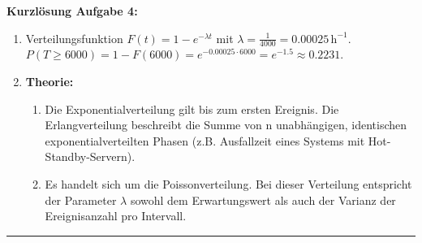 \documentclass[11pt,a4paper]{article}
\begin{document}
\newpage

\textbf{Kurzlösung Aufgabe 4:}
\begin{enumerate}
    \item[a)] Verteilungsfunktion $F(t) = 1 - e^{-\lambda t}$ mit $\lambda = \frac{1}{4000} = 0.00025 \, \text{h}^{-1}$. \\
    $P(T \ge 6000) = 1 - F(6000) = e^{-0.00025 \cdot 6000} = e^{-1.5} \approx 0.2231.$
    \item[b)] \textbf{Theorie:}
    \begin{enumerate}
        \item[1.] Die Exponentialverteilung gilt bis zum ersten Ereignis. Die Erlangverteilung beschreibt die Summe von n unabhängigen, identischen exponentialverteilten Phasen (z.B. Ausfallzeit eines Systems mit Hot-Standby-Servern).
        \item[2.] Es handelt sich um die Poissonverteilung. Bei dieser Verteilung entspricht der Parameter $\lambda$ sowohl dem Erwartungswert als auch der Varianz der Ereignisanzahl pro Intervall.
    \end{enumerate}
\end{enumerate}

\hrule
\vspace{0.4cm}
\end{document}

